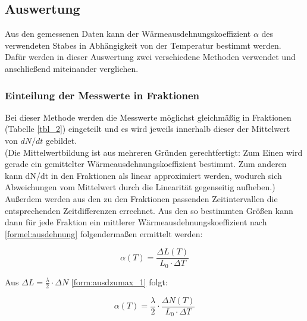 \subsection{Auswertung}
Aus den gemessenen Daten kann der Wärmeausdehnungskoeffizient $ \alpha $ des verwendeten Stabes in Abhängigkeit von der Temperatur bestimmt werden. Dafür werden in dieser Auswertung zwei verschiedene Methoden verwendet und anschließend miteinander verglichen.

\subsubsection{Einteilung der Messwerte in Fraktionen}
Bei dieser Methode werden die Messwerte möglichst gleichmäßig in Fraktionen (Tabelle \ref{tbl_2}) eingeteilt und es wird jeweils innerhalb dieser der Mittelwert von $dN/dt$ gebildet.\\
(Die Mittelwertbildung ist aus mehreren Gründen gerechtfertigt: Zum Einen wird gerade ein gemittelter Wärmeausdehnungskoeffizient bestimmt. Zum anderen kann dN/dt in den Fraktionen als linear approximiert werden, wodurch sich Abweichungen vom Mittelwert durch die Linearität gegenseitig aufheben.) Außerdem werden aus den zu den Fraktionen passenden Zeitintervallen die entsprechenden Zeitdifferenzen errechnet. Aus den so bestimmten Größen kann dann für jede Fraktion ein mittlerer Wärmeausdehnungskoeffizient nach \eqref{formel:ausdehnung} folgendermaßen ermittelt werden:

\begin{equation}
\alpha(T)=\frac{\Delta L(T)}{L_{0} \cdot \Delta T}
\end{equation}

Aus $ \Delta L = \frac{\lambda}{2} \cdot \Delta N $ \eqref{form:ausdzumax_1} folgt:

\begin{equation}
\alpha (T)= \frac{\lambda}{2} \cdot \frac{\Delta N(T)}{L_0 \cdot \Delta T}
\end{equation}

